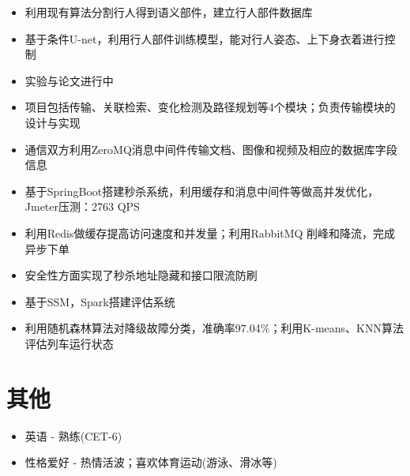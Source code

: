 \documentclass{resume}
\begin{document}
\begin{itemize}[topsep = 0 pt, partopsep = 0pt]
  \item 利用现有算法分割行人得到语义部件，建立行人部件数据库
  \item 基于条件U-net，利用行人部件训练模型，能对行人姿态、上下身衣着进行控制
  \item 实验与论文进行中
\end{itemize}

\begin{itemize}[topsep = 0 pt, partopsep = 0pt]
  \item 项目包括传输、关联检索、变化检测及路径规划等4个模块；负责传输模块的设计与实现
  \item 通信双方利用ZeroMQ消息中间件传输文档、图像和视频及相应的数据库字段信息
\end{itemize}

\begin{itemize}[topsep = 0 pt, partopsep = 0pt]
  \item 基于SpringBoot搭建秒杀系统，利用缓存和消息中间件等做高并发优化，Jmeter压测：2763 QPS
  \item 利用Redis做缓存提高访问速度和并发量；利用RabbitMQ 削峰和降流，完成异步下单
  \item 安全性方面实现了秒杀地址隐藏和接口限流防刷
\end{itemize}

\begin{itemize}[topsep = 0 pt, partopsep = 0pt]
  \item 基于SSM，Spark搭建评估系统
  \item 利用随机森林算法对降级故障分类，准确率97.04$\%$；利用K-means、KNN算法评估列车运行状态
\end{itemize}

\section{其他}
\begin{itemize}[parsep=0.5ex]
  \item  英语 - 熟练(CET-6)
  \item  性格爱好 - 热情活波；喜欢体育运动(游泳、滑冰等)
\end{itemize}
\end{document}
